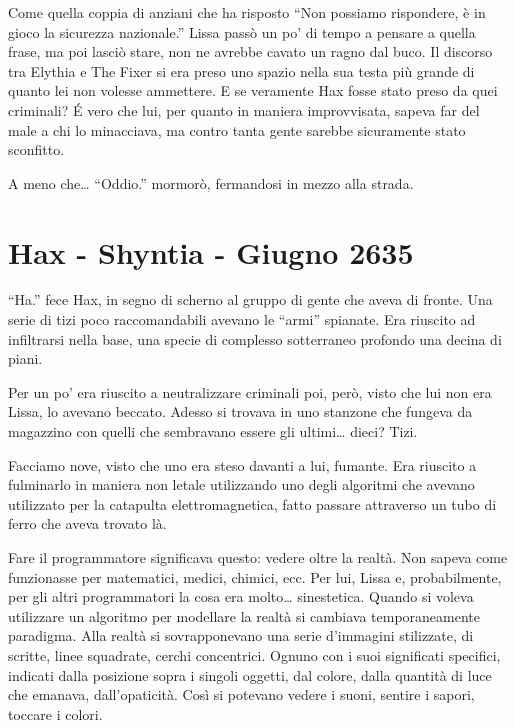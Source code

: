     Come quella coppia di anziani che ha risposto ``Non possiamo
    rispondere, è in gioco la sicurezza nazionale.'' Lissa passò un po' di
    tempo a pensare a quella frase, ma poi lasciò stare, non ne avrebbe
    cavato un ragno dal buco. Il discorso tra Elythia e The Fixer si era
    preso uno spazio nella sua testa più grande di quanto lei non volesse
    ammettere. E se veramente Hax fosse stato preso da quei criminali? \'E
    vero che lui, per quanto in maniera improvvisata, sapeva far del male a
    chi lo minacciava, ma contro tanta gente sarebbe sicuramente stato
    sconfitto.

    A meno che\dots{} ``Oddio.'' mormorò, fermandosi in mezzo alla strada.

    \section{Hax - Shyntia - Giugno 2635}
    ``Ha.'' fece Hax, in segno di scherno al gruppo di gente che aveva di
    fronte. Una serie di tizi poco raccomandabili avevano le ``armi''
    spianate. Era riuscito ad infiltrarsi nella base, una specie di
    complesso sotterraneo profondo una decina di piani.

    Per un po' era riuscito a neutralizzare criminali poi, però, visto che
    lui non era Lissa, lo avevano beccato. Adesso si trovava in uno
    stanzone che fungeva da magazzino con quelli che sembravano essere gli
    ultimi\dots{} dieci? Tizi.

    Facciamo nove, visto che uno era steso davanti a lui, fumante. Era
    riuscito a fulminarlo in maniera non letale utilizzando uno degli
    algoritmi che avevano utilizzato per la catapulta elettromagnetica,
    fatto passare attraverso un tubo di ferro che aveva trovato là.

    Fare il programmatore significava questo: vedere oltre la realtà. Non
    sapeva come funzionasse per matematici, medici, chimici, ecc. Per lui,
    Lissa e, probabilmente, per gli altri programmatori la cosa era
    molto\dots{} sinestetica. Quando si voleva utilizzare un algoritmo per
    modellare la realtà si cambiava temporaneamente paradigma. Alla realtà
    si sovrapponevano una serie d'immagini stilizzate, di scritte, linee
    squadrate, cerchi concentrici. Ognuno con i suoi significati specifici,
    indicati dalla posizione sopra i singoli oggetti, dal colore, dalla
    quantità di luce che emanava, dall'opaticità. Così si potevano vedere i
    suoni, sentire i sapori, toccare i colori.

